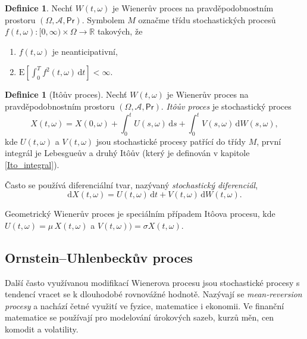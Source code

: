 \documentclass[a4paper,12pt]{report}
\theoremstyle{definition} \newtheorem{definice}[veta]{Definice}
\theoremstyle{remark}
\begin{document}
\begin{definice}\label{M}
Nechť $W(t,\omega)$ je Wienerův proces na pravděpodobnostním prostoru $(\Omega,\mathcal{A},\mathsf{Pr})$.
Symbolem $M$ označme třídu stochastických procesů \linebreak$f(t,\omega):[0,\infty)\times\Omega\to\mathbb R$ takových, že
\begin{enumerate}
\item[1.] $f(t,\omega)$ je neanticipativní, 
\item[2.] $\text{E}\left[\int_0^Tf^2(t,\omega)\,\mathrm{d}t\right]<\infty.$ 
\end{enumerate}
\end{definice}

\begin{definice}[It\^oův proces]
Nechť $W(t,\omega)$ je Wienerův proces na pravděpodobnostním prostoru $(\Omega,\mathcal{A},\mathsf{Pr})$.
\textit{It\^oův proces} je stochastický proces
$$X(t,\omega)=X(0,\omega)+\int_0^tU(s,\omega)\,\mathrm{d}s+\int_0^tV(s,\omega)\,\mathrm{d}W(s,\omega),$$
kde $U(t,\omega)$ a $V(t,\omega)$ jsou stochastické procesy patřící do třídy $M$,
první integrál je Lebesgueův a druhý It\^oův (který je definován v kapitole \ref{Ito_integral}).

Často se používá diferenciální tvar, nazývaný \textit{stochastický diferenciál},
$$\mathrm{d}X(t,\omega)=U(t,\omega)\,\mathrm{d}t+V(t,\omega)\,\mathrm{d}W(t,\omega).$$
\end{definice}

Geometrický Wienerův proces je speciálním případem It\^oova procesu, kde $U(t,\omega)=\mu\,X(t,\omega)$ a $V(t,\omega))=\sigma X(t,\omega)$.

\subsection{Ornstein–Uhlenbeckův proces}
Další často využívanou modifikací Wienerova procesu jsou stochastické procesy s tendencí vracet se k dlouhodobé rovnovážné hodnotě.
Nazývají se \textit{mean-reversion procesy} a nachází četné využití ve fyzice, matematice i ekonomii.
Ve finanční matematice se používají pro modelování úrokových sazeb, kurzů měn, cen komodit a volatility.
\end{document}
